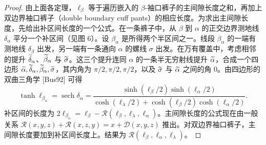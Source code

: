 \begin{proof}
由上面各定理，$\ell_\beta$ 等于遍历嵌入的 $\beta$-袖口裤子的主间隙长度之和，再加上双边界袖口裤子（double boundary cuff pants）的相应长度。为求出主间隙长度，先给出补区间长度的一个公式。在一条裤子中，从 $\beta$ 到 $\alpha$ 的正交边界测地线 $\delta_\alpha$ 平分一个补区间（见图 6）。设 $\beta_\alpha$ 是所得两个半区间之一。线段 $\beta_\alpha$ 的一端有测地线 $\delta_\beta$ 出发，另一端有一条通向 $\alpha$ 的螺线 $\sigma$ 出发。在万有覆盖中，考虑相邻的提升 $\widetilde{\delta}_\alpha$、$\widetilde{\beta}_\alpha$ 与 $\widetilde{\sigma}$。这三个提升连同 $\alpha$ 的一条半无穷射线提升 $\widetilde{\alpha}$，合成一个四边形 $\widetilde{\alpha},\widetilde{\delta}_\alpha,\widetilde{\beta}_\alpha,\widetilde{\sigma}$，其内角为 $\pi/2,\pi/2,\pi/2$，以及 $\widetilde{\sigma}$ 与 $\widetilde{\alpha}$ 之间的角 $0$。由四边形的双曲三角学 [Bus92] 可得
\[
\tanh\ell_{\beta_\alpha}=\operatorname{sech}\delta_\alpha=\frac{\sinh(\ell_\beta/2)\sinh(\ell_\alpha/2)}{\cosh(\ell_\lambda/2)+\cosh(\ell_\beta/2)\cosh(\ell_\alpha/2)}.
\]
补区间的长度为 $2\ell_{\beta_\alpha}=\ell_\beta-\mathcal{R}(\ell_\beta,\ell_\lambda,\ell_\alpha)$。主间隙长度的公式现在由一般关系 $\mathcal{R}(x,y,z)+\mathcal{R}(x,z,y)=x+\mathcal{D}(x,y,z)$ 推出。对双边界袖口裤子，主间隙长度要加到补区间长度上。结果为 $\mathcal{R}(\ell_\beta,\ell_\alpha,\ell_\lambda)$。
\end{proof}


